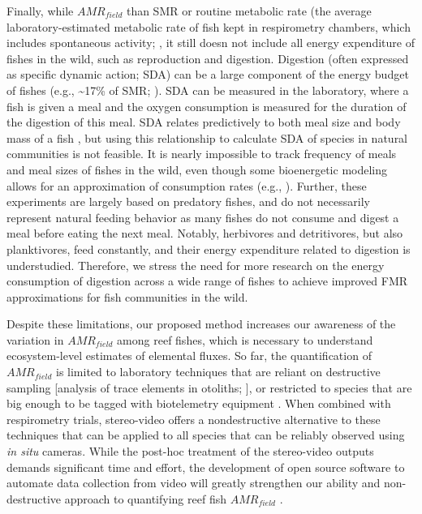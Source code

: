 \documentclass[
]{article}
\begin{document}
\par

Finally, while \(AMR_{field}\) than SMR or routine metabolic rate (the
average laboratory-estimated metabolic rate of fish kept in respirometry
chambers, which includes spontaneous activity; \citet{Norin2020}, it
still doesn not include all energy expenditure of fishes in the wild,
such as reproduction and digestion. Digestion (often expressed as
specific dynamic action; SDA) can be a large component of the energy
budget of fishes (e.g., \textasciitilde17\% of SMR; \citet{Holt2015}).
SDA can be measured in the laboratory, where a fish is given a meal and
the oxygen consumption is measured for the duration of the digestion of
this meal. SDA relates predictively to both meal size and body mass of a
fish \citep{Secor2009}, but using this relationship to calculate SDA of
species in natural communities is not feasible. It is nearly impossible
to track frequency of meals and meal sizes of fishes in the wild, even
though some bioenergetic modeling allows for an approximation of
consumption rates (e.g., \citet{Schiettekatte2020}). Further, these
experiments are largely based on predatory fishes, and do not
necessarily represent natural feeding behavior as many fishes do not
consume and digest a meal before eating the next meal. Notably,
herbivores and detritivores, but also planktivores, feed constantly, and
their energy expenditure related to digestion is understudied.
Therefore, we stress the need for more research on the energy
consumption of digestion across a wide range of fishes to achieve
improved FMR approximations for fish communities in the wild.

Despite these limitations, our proposed method increases our awareness
of the variation in \(AMR_{field}\) among reef fishes, which is
necessary to understand ecosystem-level estimates of elemental fluxes.
So far, the quantification of \(AMR_{field}\) is limited to laboratory
techniques that are reliant on destructive sampling {[}analysis of trace
elements in otoliths; \citet{Chung2019}{]}, or restricted to species
that are big enough to be tagged with biotelemetry equipment
\citep{Treberg2016, Brodie2016}. When combined with respirometry trials,
stereo-video offers a nondestructive alternative to these techniques
that can be applied to all species that can be reliably observed using
\emph{in situ} cameras. While the post-hoc treatment of the stereo-video
outputs demands significant time and effort, the development of open
source software to automate data collection from video will greatly
strengthen our ability and non-destructive approach to quantifying reef
fish \(AMR_{field}\) \citep{Bassett2011, Guenard2008}.
\end{document}
